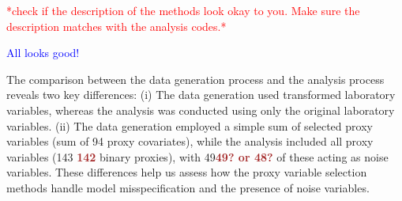 \documentclass[sn-vancouver,Numbered,lineno,pdflatex]{sn-jnl}
\begin{document}
\textcolor{red}{*check if the description of the methods look okay to you. Make sure the description matches with the analysis codes.*}

\textcolor{blue}{All looks good!}

The comparison between the data generation process and the analysis
process reveals two key differences: (i) The data generation used
transformed laboratory variables, whereas the analysis was conducted
using only the original laboratory variables. (ii) The data generation
employed a simple sum of selected proxy variables (sum of 94 proxy
covariates), while the analysis included all proxy variables (143
\textcolor{brown}{\textbf{142}} binary proxies), with
49\textcolor{brown}{\textbf{49? or 48?}} of these acting as noise
variables. These differences help us assess how the proxy variable
selection methods handle model misspecification and the presence of
noise variables.
\end{document}
